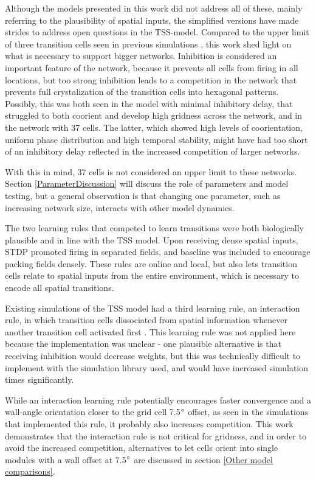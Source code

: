 \documentclass{article}
\begin{document}
    Although the models presented in this work did not address all of these, mainly referring to the plausibility of spatial inputs, the simplified versions have made strides to address open questions in the TSS-model. Compared to the upper limit of three transition cells seen in previous simulations \parencite{Waniek2017}, this work shed light on what is necessary to support bigger networks. Inhibition is considered an important feature of the network, because it prevents all cells from firing in all locations, but too strong inhibition leads to a competition in the network that prevents full crystalization of the transition cells into hexagonal patterns. Possibly, this was both seen in the model with minimal inhibitory delay, that struggled to both coorient and develop high gridness across the network, and in the network with 37 cells. The latter, which showed high levels of coorientation, uniform phase distribution and high temporal stability, might have had too short of an inhibitory delay reflected in the increased competition of larger networks.

    With this in mind, 37 cells is not considered an upper limit to these networks. Section \ref{ParameterDiscussion} will discuss the role of parameters and model testing, but a general observation is that changing one parameter, such as increasing network size, interacts with other model dynamics.

    The two learning rules that competed to learn transitions were both biologically plausible and in line with the TSS model. Upon receiving dense spatial inputs, STDP promoted firing in separated fields, and baseline was included to encourage packing fields densely. These rules are online and local, but also lets transition cells relate to spatial inputs from the entire environment, which is necessary to encode all spatial transitions.
    
    Existing simulations of the TSS model had a third learning rule, an interaction rule, in which transition cells dissociated from spatial information whenever another transition cell activated first \parencite{Waniek2017}. This learning rule was not applied here because the implementation was unclear - one plausible alternative is that receiving inhibition would decrease weights, but this was technically difficult to implement with the simulation library used, and would have increased simulation times significantly. 
    
    While an interaction learning rule potentially encourages faster convergence and a wall-angle orientation closer to the grid cell 7.5\(\degree\) offset, as seen in the simulations that implemented this rule, it probably also increases competition. This work demonstrates that the interaction rule is not critical for gridness, and in order to avoid the increased competition, alternatives to let cells orient into single modules with a wall offset at 7.5\(\degree\) are discussed in section \ref{Other model comparisons}.
    
\end{document}
